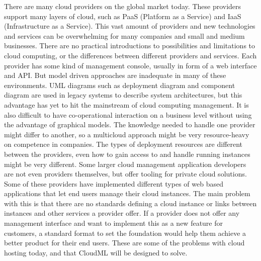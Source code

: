 There are many cloud providers on the global market today. These providers support many layers of cloud, 
such as PaaS (Platform as a Service) and IaaS (Infrastructure as a Service). 
This vast amount of providers and new technologies and services can be overwhelming for many companies and small and medium businesses. 
There are no practical introductions to possibilities and limitations to cloud computing, or the differences between different providers and services. 
Each provider has some kind of management console, usually in form of a web interface and API. 
But model driven approaches are inadequate in many of these environments. 
UML diagrams such as deployment diagram and component diagram are used in legacy systems to describe system architectures, 
but this advantage has yet to hit the mainstream of cloud computing management. 
It is also difficult to have co-operational interaction on a business level without using the advantage of graphical models.
The knowledge needed to handle one provider might differ to another, so a multicloud approach might be very resource-heavy on competence in companies. 
The types of deployment resources are different between the providers, even how to gain access to and handle running instances might be very different. 
Some larger cloud management application developers are not even providers themselves, but offer tooling for private cloud solutions.
Some of these providers have implemented different types of web based applications that let end users manage their cloud instances. 
The main problem with this is that there are no standards defining a cloud instance or links between instances and other services a provider offer.
If a provider does not offer any management interface and want to implement this as a new feature for customers, 
a standard format to set the foundation would help them achieve a better product for their end users.
These are some of the problems with cloud hosting today, and that CloudML will be designed to solve.
